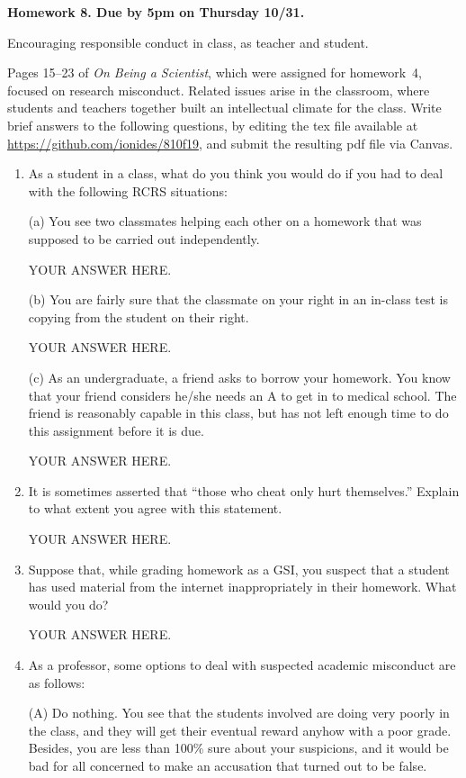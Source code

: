 \documentclass[12pt]{article}
\begin{document}
\begin{center}\bf
Homework 8. Due by 5pm on Thursday 10/31.

Encouraging responsible conduct in class, as teacher and student.

\end{center}
Pages 15--23 of {\em On Being a Scientist}, which were assigned for homework~4, focused on research misconduct.  Related issues arise in the classroom, where students and teachers together built an intellectual climate for the class.  Write brief answers to the following questions, by editing the tex file available at \url{https://github.com/ionides/810f19}, and submit the resulting pdf file via Canvas.

\begin{enumerate}

\item As a student in a class, what do you think you would do if you had to deal with the following RCRS situations:

(a) You see two classmates helping each other on a homework that was supposed to be carried out independently.

YOUR ANSWER HERE.

(b) You are fairly sure that the classmate on your right in an in-class test is copying from the student on their right.

YOUR ANSWER HERE.

(c) As an undergraduate, a friend asks to borrow your homework. You know that your friend considers he/she needs an A to get in to medical school. The friend is reasonably capable in this class, but has not left enough time to do this assignment before it is due.

YOUR ANSWER HERE.

\item It is sometimes asserted that ``those who cheat only hurt themselves.'' Explain to what extent you agree with this statement.

YOUR ANSWER HERE.

\item Suppose that, while grading homework as a GSI, you suspect that a student has used material from the internet inappropriately in their homework. What would you do?

YOUR ANSWER HERE.

\item As a professor, some options to deal with suspected academic misconduct are as follows:

(A) Do nothing. You see that the students involved are doing very poorly in the class, and they will get their eventual reward anyhow with a poor grade. Besides, you are less than 100\% sure about your suspicions, and it would be bad for all concerned to make an accusation that turned out to be false.


\end{enumerate}
\end{document}
